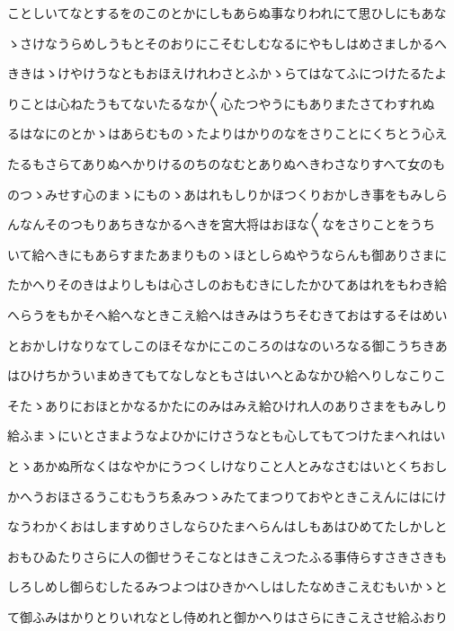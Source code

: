 \documentclass[a4paper,11pt,landscape]{ltjtarticle}
\begin{document}
\par\medskip
ことしいてなとするをのこのとかにしもあらぬ事なりわれにて思ひしにもあな
\par\medskip
ゝさけなうらめしうもとそのおりにこそむしむなるにやもしはめさましかるへ
\par\medskip
ききはゝけやけうなともおほえけれわさとふかゝらてはなてふにつけたるたよ
\par\medskip
りことは心ねたうもてないたるなか〱心たつやうにもありまたさてわすれぬ
\par\medskip
るはなにのとかゝはあらむものゝたよりはかりのなをさりことにくちとう心え
\par\medskip
たるもさらてありぬへかりけるのちのなむとありぬへきわさなりすへて女のも
\par\medskip
のつゝみせす心のまゝにものゝあはれもしりかほつくりおかしき事をもみしら
\par\medskip
んなんそのつもりあちきなかるへきを宮大将はおほな〱なをさりことをうち
\par\medskip
いて給へきにもあらすまたあまりものゝほとしらぬやうならんも御ありさまに
\par\medskip
たかへりそのきはよりしもは心さしのおもむきにしたかひてあはれをもわき給
\par\medskip
へらうをもかそへ給へなときこえ給へはきみはうちそむきておはするそはめい
\par\medskip
とおかしけなりなてしこのほそなかにこのころのはなのいろなる御こうちきあ
\par\medskip
はひけちかういまめきてもてなしなともさはいへとゐなかひ給へりしなこりこ
\par\medskip
そたゝありにおほとかなるかたにのみはみえ給ひけれ人のありさまをもみしり
\par\medskip
給ふまゝにいとさまようなよひかにけさうなとも心してもてつけたまへれはい
\par\medskip
とゝあかぬ所なくはなやかにうつくしけなりこと人とみなさむはいとくちおし
\par\medskip
かへうおほさるうこむもうちゑみつゝみたてまつりておやときこえんにはにけ
\par\medskip
なうわかくおはしますめりさしならひたまへらんはしもあはひめてたしかしと
\par\medskip
おもひゐたりさらに人の御せうそこなとはきこえつたふる事侍らすさきさきも
\par\medskip
しろしめし御らむしたるみつよつはひきかへしはしたなめきこえむもいかゝと
\par\medskip
て御ふみはかりとりいれなとし侍めれと御かへりはさらにきこえさせ給ふおり
\end{document}
